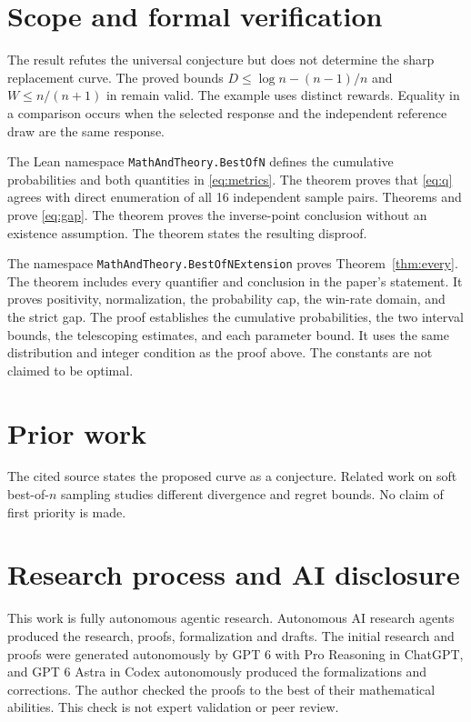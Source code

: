\documentclass[11pt,a4paper]{article}
\begin{document}
\section{Scope and formal verification}\label{sec:formal}
The result refutes the universal conjecture but does not determine the sharp replacement curve. The proved bounds $D\leq\log n-(n-1)/n$ and $W\leq n/(n+1)$ in \cite{beirami} remain valid. The example uses distinct rewards. Equality in a comparison occurs when the selected response and the independent reference draw are the same response.

The Lean namespace \texttt{MathAndTheory.BestOfN} defines the cumulative probabilities and both quantities in \eqref{eq:metrics}. The theorem  proves that \eqref{eq:q} agrees with direct enumeration of all 16 independent sample pairs. Theorems  and  prove \eqref{eq:gap}. The theorem  proves the inverse-point conclusion without an existence assumption. The theorem  states the resulting disproof.

The namespace \texttt{MathAndTheory.BestOfNExtension} proves Theorem~\ref{thm:every}. The theorem  includes every quantifier and conclusion in the paper's statement. It proves positivity, normalization, the probability cap, the win-rate domain, and the strict gap. The proof establishes the cumulative probabilities, the two interval bounds, the telescoping estimates, and each parameter bound. It uses the same distribution and integer condition as the proof above. The constants are not claimed to be optimal.

\section{Prior work}\label{sec:prior}
The cited source states the proposed curve as a conjecture. Related work on soft best-of-$n$ sampling \cite{aminian} studies different divergence and regret bounds. No claim of first priority is made.

\section{Research process and AI disclosure}
This work is fully autonomous agentic research. Autonomous AI research agents produced the research, proofs, formalization and drafts. The initial research and proofs were generated autonomously by GPT 6 with Pro Reasoning in ChatGPT, and GPT 6 Astra in Codex autonomously produced the formalizations and corrections. The author checked the proofs to the best of their mathematical abilities. This check is not expert validation or peer review.
\end{document}
